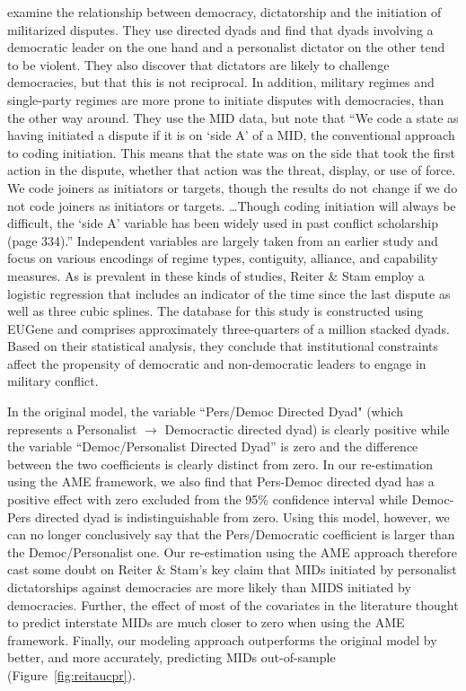 \citet{reiter:stam:2003} examine the relationship between democracy, dictatorship and the initiation of militarized disputes.  They use directed dyads and find that dyads involving a democratic leader on the one hand and a personalist dictator on the other tend to be violent. They also discover that dictators are likely to challenge democracies, but that this is not reciprocal.  In addition, military regimes and single-party regimes are more prone to initiate disputes with democracies, than the other way around.  They use the MID data, but note that ``We code a state as having initiated a dispute if it is on `side A' of a MID, the conventional approach to coding initiation. This means that the state was on the side that took the first action in the dispute, whether that action was the threat, display, or use of force. We code joiners as initiators or targets, though the results do not change if we do not code joiners as initiators or targets. \ldots Though coding initiation will always be difficult, the `side A' variable has been widely used in past conflict scholarship (page 334).'' Independent variables are largely taken from an earlier study and focus on various encodings of regime types, contiguity, alliance, and capability measures. As is prevalent in these kinds of studies, Reiter \& Stam employ a logistic regression that includes an indicator of the time since the last dispute as well as three cubic splines. The database for this study is constructed using EUGene \citep{bennett:stam:2000} and comprises approximately three-quarters of a million stacked dyads. Based on their statistical analysis, they conclude that institutional constraints affect the propensity of democratic and non-democratic leaders to engage in military conflict. 

In the original model, the variable ``Pers/Democ Directed Dyad" (which represents a Personalist $\rightarrow$ Democractic directed dyad) is clearly positive while the variable ``Democ/Personalist Directed Dyad'' is zero and the difference between the two coefficients is clearly distinct from zero. In our re-estimation using the AME framework, we also find that Pers-Democ directed dyad has a positive effect with zero excluded from the 95\% confidence interval while Democ-Pers directed dyad is indistinguishable from zero. Using this model, however, we can no longer conclusively say that the Pers/Democratic coefficient is larger than the Democ/Personalist one. Our re-estimation using the AME approach therefore cast some doubt on Reiter \& Stam's key claim that MIDs initiated by personalist dictatorships against democracies are more likely than MIDS initiated by democracies. Further, the effect of most of the covariates in the literature thought to predict interstate MIDs are much closer to zero when using the AME framework. Finally, our modeling approach outperforms the original model by better, and more accurately, predicting MIDs out-of-sample (Figure~\ref{fig:reitaucpr}).  

